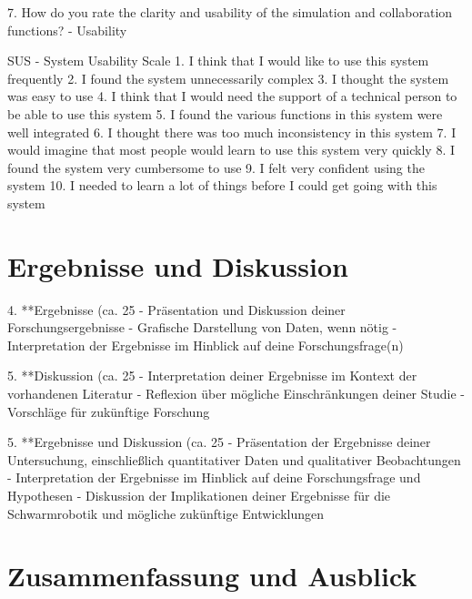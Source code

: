 \documentclass[german,version-2020-11]{uzl-thesis}
\begin{document}
\begin{Code}
              7. How do you rate the clarity and usability of the simulation and collaboration functions? - Usability
            
            
      
      
            SUS - System Usability Scale
            1. I think that I would like to use this system frequently
            2. I found the system unnecessarily complex
            3. I thought the system was easy to use
            4. I think that I would need the support of a technical person to be able to use this system
            5. I found the various functions in this system were well integrated
            6. I thought there was too much inconsistency in this system
            7. I would imagine that most people would learn to use this system very quickly
            8. I found the system very cumbersome to use
            9. I felt very confident using the system
            10. I needed to learn a lot of things before I could get going with this system 
      
      \end{Code}


    
\chapter{Ergebnisse und Diskussion}
      4. **Ergebnisse (ca. 25%
      - Präsentation und Diskussion deiner Forschungsergebnisse
      - Grafische Darstellung von Daten, wenn nötig
      - Interpretation der Ergebnisse im Hinblick auf deine Forschungsfrage(n)
   
   5. **Diskussion (ca. 25%
      - Interpretation deiner Ergebnisse im Kontext der vorhandenen Literatur
      - Reflexion über mögliche Einschränkungen deiner Studie
      - Vorschläge für zukünftige Forschung
      
      5. **Ergebnisse und Diskussion (ca. 25%
         - Präsentation der Ergebnisse deiner Untersuchung, einschließlich quantitativer Daten und qualitativer Beobachtungen
         - Interpretation der Ergebnisse im Hinblick auf deine Forschungsfrage und Hypothesen
         - Diskussion der Implikationen deiner Ergebnisse für die Schwarmrobotik und mögliche zukünftige Entwicklungen


\chapter{Zusammenfassung und Ausblick}
\end{document}
